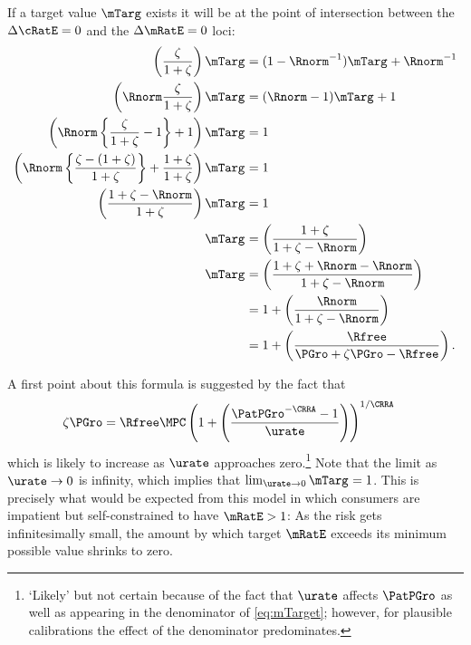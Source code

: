 \documentclass{\handout}
\begin{document}
If a target value $\mTarg$ exists it will be at the point of intersection between the $\dcEqZero$ and the $\dmEqZero$ loci:
\begin{equation}\begin{gathered}\begin{aligned}
  \left(\frac{\zeta}{1+\zeta}\right)\mTarg^{\null} & =  (1-\Rnorm^{-1})\mTarg^{\null}+\Rnorm^{-1}
\\  \left(\Rnorm\frac{\zeta}{1+\zeta}\right)\mTarg^{\null} & =  (\Rnorm-1)\mTarg^{\null}+1
\\  \left(\Rnorm\left\{\frac{\zeta}{1+\zeta}-1\right\}+1\right)\mTarg^{\null} & =  1
\\  \left(\Rnorm\left\{\frac{\zeta-(1+\zeta)}{1+\zeta}\right\}+\frac{1+\zeta}{1+\zeta}\right)\mTarg^{\null} & =  1
\\  \left(\frac{1+\zeta-\Rnorm}{1+\zeta}\right)\mTarg^{\null} & =  1
\\  \mTarg^{\null} & =  \left(\frac{1+\zeta}{1+\zeta-\Rnorm}\right)
\\  \mTarg^{\null} & =  \left(\frac{1+\zeta+\Rnorm-\Rnorm}{1+\zeta-\Rnorm}\right)
\\ & =  1 + \left(\frac{\Rnorm}{1+\zeta-\Rnorm}\right)
\\ & =  1 + \left(\frac{\Rfree}{\PGro+\zeta\PGro-\Rfree}\right)  \label{eq:mTarget}
.
\end{aligned}\end{gathered}\end{equation}

A first point about this formula is suggested by the fact that
\begin{equation}\begin{gathered}\begin{aligned}
  \zeta\PGro & =  \Rfree \MPCU \left(1+\left(\frac{\PatPGro^{-\CRRA} - 1}{\urate}\right)\right)^{1/\CRRA}
\end{aligned}\end{gathered}\end{equation}
which is likely to increase as $\urate$ approaches zero.\footnote{`Likely' but not certain because of the fact that $\urate$ affects $\PatPGro$ as well as
  appearing in the denominator of \eqref{eq:mTarget}; however, for
  plausible calibrations the effect of the denominator predominates.}
Note that the limit as $\urate \rightarrow 0$ is infinity, which
implies that $\lim_{\urate \rightarrow
  0} \mTarg^{\null} = 1$.  This is precisely what would be expected from
this model in which consumers are impatient but self-constrained to
have $\mRatE > 1$:  As the risk gets infinitesimally small, the
amount by which target $\mRatE$ exceeds its minimum possible value shrinks to
zero.
\end{document}
